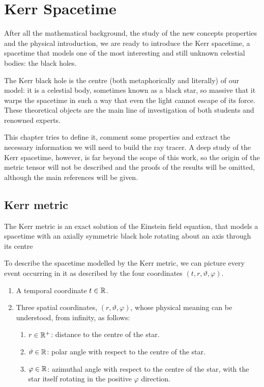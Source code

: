 \chapter{Kerr Spacetime}

After all the mathematical background, the study of the new concepts properties and the physical introduction, we are ready to introduce the Kerr spacetime, a spacetime that models one of the most interesting and still unknown celestial bodies: the black holes.

The Kerr black hole is the centre (both metaphorically and literally) of our model: it is a celestial body, sometimes known as a black star, so massive that it warps the spacetime in such a way that even the light cannot escape of its force. These theoretical objects are the main line of investigation of both students and renowned experts.

This chapter tries to define it, comment some properties and extract the necessary information we will need to build the ray tracer. A deep study of the Kerr spacetime, however, is far beyond the scope of this work, so the origin of the metric tensor will not be described and the proofs of the results will be omitted, although the main references will be given.

\section{Kerr metric}

The Kerr metric is an exact solution of the Einstein field equation, that models a spacetime with an axially symmetric black hole rotating about an axis through its centre

To describe the spacetime modelled by the Kerr metric, we can picture every event occurring in it as described by the four coordinates $(t, r, \vartheta, \varphi)$.
\begin{enumerate}
	\item A temporal coordinate $t\in\mathbb{R}$.
	\item Three spatial coordinates, $(r, \vartheta, \varphi)$, whose physical meaning can be understood, from infinity, as follows:
	\begin{enumerate}
		\item $r \in \mathbb{R}^+$: distance to the centre of the star.
		\item $\vartheta \in \mathbb{R}$: polar angle with respect to the centre of the star.
		\item $\varphi \in \mathbb{R}$: azimuthal angle with respect to the centre of the star, with the star itself rotating in the positive $\varphi$ direction.
	\end{enumerate}
\end{enumerate}

